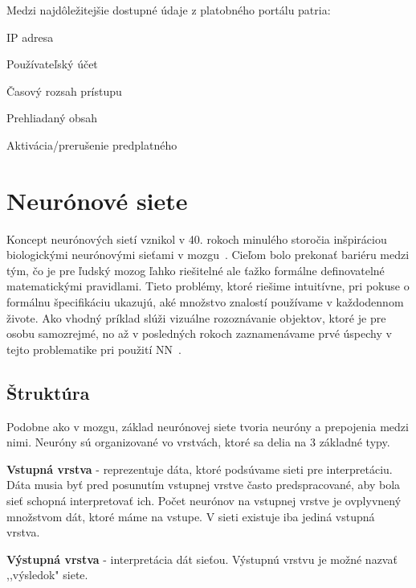 Medzi najdôležitejšie dostupné údaje z platobného portálu patria:

\begin{my_itemize}
	\item {IP adresa}
	\item {Používateľský účet}
	\item {Časový rozsah prístupu}
	\item {Prehliadaný obsah}
	\item {Aktivácia/prerušenie predplatného}
\end{my_itemize}

\section{Neurónové siete}
\label{analyza_neuronove_siete}

Koncept neurónových sietí vznikol v 40. rokoch minulého storočia inšpiráciou biologickými neurónovými sieťami v mozgu~\cite{mcculloch1943logical}.
Cieľom bolo prekonať bariéru medzi tým, čo je pre ľudský mozog ľahko riešitelné ale ťažko formálne definovatelné matematickými pravidlami. Tieto problémy, ktoré riešime intuitívne, pri pokuse o formálnu špecifikáciu ukazujú, aké množstvo znalostí používame v každodennom živote. Ako vhodný príklad slúži vizuálne rozoznávanie objektov, ktoré je pre osobu samozrejmé, no až v posledných rokoch zaznamenávame prvé úspechy v tejto problematike pri použití NN~\cite{Goodfellow-et-al-2016-Book}.

\subsection{Štruktúra}
\label{analyza_struktura_nn}

Podobne ako v mozgu, základ neurónovej siete tvoria neuróny a prepojenia medzi nimi. Neuróny sú organizované vo vrstvách, ktoré sa delia na 3 základné typy. 
\noindent

\textbf{Vstupná vrstva} - reprezentuje dáta, ktoré podsúvame sieti pre interpretáciu. Dáta musia byť pred posunutím vstupnej vrstve často predspracované, aby bola sieť schopná interpretovať ich. Počet neurónov na vstupnej vrstve je ovplyvnený množstvom dát, ktoré máme na vstupe. V sieti existuje iba jediná vstupná vrstva.
\noindent

\textbf{Výstupná vrstva} - interpretácia dát sieťou. Výstupnú vrstvu je možné nazvať ,,výsledok"  siete.
\noindent

